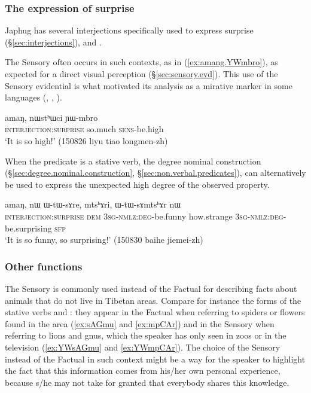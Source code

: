 \subsubsection{The expression of surprise} \label{sec:mirative}
Japhug has several interjections specifically used to express surprise (§\ref{sec:interjections}),  and . 

The Sensory often occurs in such contexts, as in (\ref{ex:amang.YWmbro}), as expected for a direct visual perception (§\ref{sec:sensory.evd}). This use of the Sensory evidential is what motivated its analysis as a mirative marker in some languages (\citealt{hill12mirativity}, \citealt{delancey12still}, \citealt{aikhenvald12mirativity}).

\begin{exe}
\ex \label{ex:amang.YWmbro}
 \gll amaŋ, nɯstʰɯci ɲɯ-mbro \\
 \textsc{interjection}:\textsc{surprise} so.much \textsc{sens}-be.high \\
 \glt `It is so high!' (150826 liyu tiao longmen-zh) 
\end{exe}

When the predicate is a stative verb, the degree nominal construction (§\ref{sec:degree.nominal.construction}, §\ref{sec:non.verbal.predicates}), can alternatively be used to express the unexpected high degree of the observed property.

\begin{exe}
\ex \label{ex:amang.WtWsAre}
 \gll amaŋ, nɯ ɯ-tɯ-sɤre, mtsʰɤri, ɯ-tɯ-sɤmtsʰɤr nɯ \\
 \textsc{interjection}:\textsc{surprise} \textsc{dem} \textsc{3sg}-\textsc{nmlz}:\textsc{deg}-be.funny  how.strange \textsc{3sg}-\textsc{nmlz}:\textsc{deg}-be.surprising \textsc{sfp} \\
 \glt `It is so funny, so surprising!' (150830 baihe jiemei-zh)
\end{exe}



\subsubsection{Other functions} \label{sec:sensory.other}
The Sensory is commonly used instead of the Factual for describing facts about animals that do not live in Tibetan areas. Compare for instance the forms of the stative verbs  and : they appear in the Factual when referring to spiders or flowers found in the area (\ref{ex:sAGmu} and \ref{ex:mpCAr}) and in the Sensory when referring to lions and gnus, which the speaker has only seen in zoos or in the television  (\ref{ex:YWsAGmu} and \ref{ex:YWmpCAr}). The choice of the Sensory instead of the Factual in such context might be a way for the speaker to highlight the fact that this information comes from his/her own personal experience, because s/he may not take for granted that everybody shares this knowledge.

